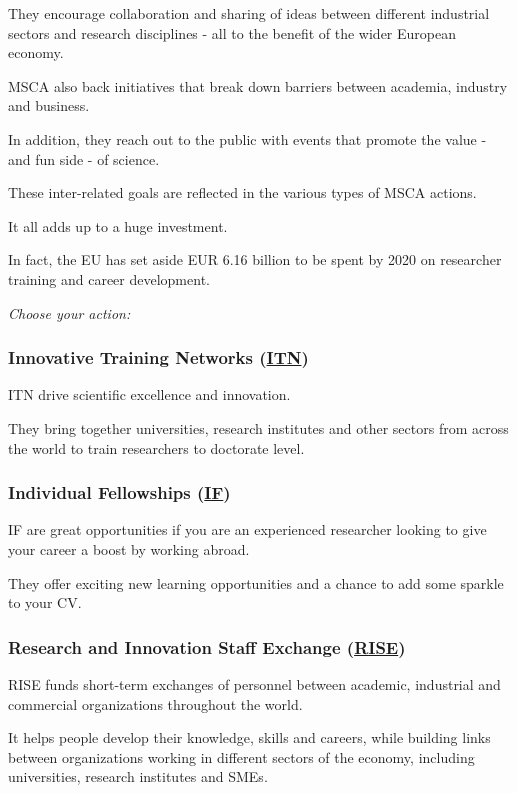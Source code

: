 \documentclass[oneside]{book}
\numberwithin{equation}{section}
\begin{document}
They encourage collaboration and sharing of ideas between different industrial sectors and research disciplines - all to the benefit of the wider European economy.

MSCA also back initiatives that break down barriers between academia, industry and business.

In addition, they reach out to the public with events that promote the value - and fun side - of science.

%
These inter-related goals are reflected in the various types of MSCA actions.

%
It all adds up to a huge investment.

In fact, the EU has set aside EUR 6.16 billion to be spent by 2020 on researcher training and career development.

\textit{Choose your action:}

\subsubsection{Innovative Training Networks (\href{https://ec.europa.eu/research/mariecurieactions/actions/research-networks_en}{ITN})}
ITN drive scientific excellence and innovation.

They bring together universities, research institutes and other sectors from across the world to train researchers to doctorate level.

\subsubsection{Individual Fellowships (\href{https://ec.europa.eu/research/mariecurieactions/actions/individual-fellowships_en}{IF})}
IF are great opportunities if you are an experienced researcher looking to give your career a boost by working abroad.

They offer exciting new learning opportunities and a chance to add some sparkle to your CV.

\subsubsection{Research and Innovation Staff Exchange (\href{https://ec.europa.eu/research/mariecurieactions/actions/staff-exchange_en}{RISE})}
RISE funds short-term exchanges of personnel between academic, industrial and commercial organizations throughout the world.

%
It helps people develop their knowledge, skills and careers, while building links between organizations working in different sectors of the economy, including universities, research institutes and SMEs.
\end{document}
